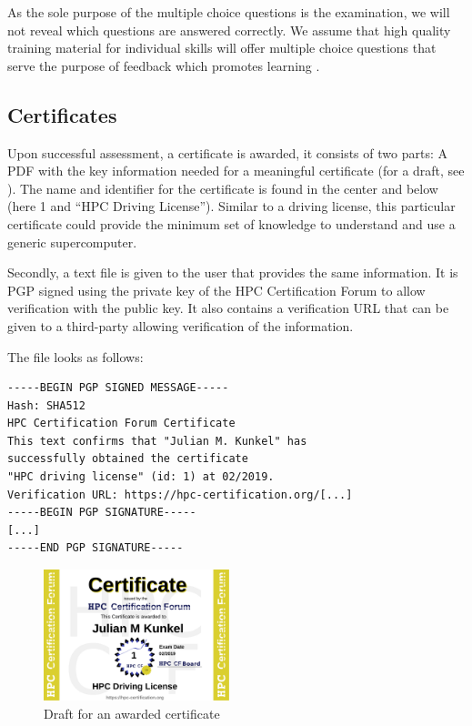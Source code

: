 \documentclass[jocse]{jocseart}
\begin{document}
As the sole purpose of the multiple choice questions is the examination, we will not reveal which questions are answered correctly.
We assume that high quality training material for individual skills will offer multiple choice questions that serve the purpose of feedback which promotes learning  \cite{epstein2002immediate}.

\subsection{Certificates}

Upon successful assessment, a certificate is awarded, it consists of two parts:
A PDF with the key information needed for a meaningful certificate (for a draft, see ).
The name and identifier for the certificate is found in the center and below (here 1 and “HPC Driving License”).
Similar to a driving license, this particular certificate could provide the minimum set of knowledge to understand and use a generic supercomputer.

Secondly, a text file is given to the user that provides the same information.
It is PGP signed using the private key of the HPC Certification Forum to allow verification with the  public key.
It also contains a verification URL that can be given to a third-party allowing verification of the information.

The file looks as follows:
\begin{verbatim}
-----BEGIN PGP SIGNED MESSAGE-----
Hash: SHA512
HPC Certification Forum Certificate
This text confirms that "Julian M. Kunkel" has
successfully obtained the certificate
"HPC driving license" (id: 1) at 02/2019.
Verification URL: https://hpc-certification.org/[...]
-----BEGIN PGP SIGNATURE-----
[...]
-----END PGP SIGNATURE-----
\end{verbatim}

\begin{figure}
  \includegraphics[width=0.48\textwidth]{JulianMKunkel}
  \caption{Draft for an awarded certificate}
  \label{fig:awardedCertificate}
\end{figure}
\end{document}
